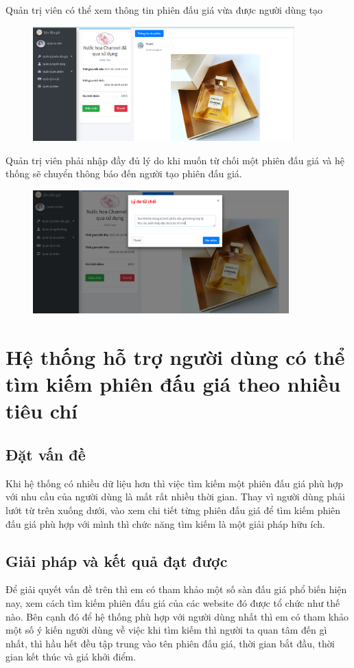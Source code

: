 \documentclass[../DoAn.tex]{subfiles}
\begin{document}
Quản trị viên có thể xem thông tin phiên đấu giá vừa được người dùng tạo
\begin{figure}[H]
    \centering
    \includegraphics[width=0.75\linewidth,height=4.41cm]{Hinhve/adminconfirm.png}
\end{figure}
Quản trị viên phải nhập đầy đủ lý do khi muốn từ chối một phiên đấu giá và hệ thống sẽ chuyển thông báo đến người tạo phiên đấu giá.
\begin{figure}[H]
    \centering
    \includegraphics[width=0.75\linewidth,height=4.74cm]{Hinhve/adminreject.png}
\end{figure}
\section{Hệ thống hỗ trợ người dùng có thể tìm kiếm phiên đấu giá theo nhiều tiêu chí}
\subsection{Đặt vấn đề}
Khi hệ thống có nhiều dữ liệu hơn thì việc tìm kiếm một phiên đấu giá phù hợp với nhu cầu của người dùng là mất rất nhiều thời gian. Thay vì người dùng phải lướt từ trên xuống dưới, vào xem chi tiết từng phiên đấu giá để tìm kiếm phiên đấu giá phù hợp với mình thì chức năng tìm kiếm là một giải pháp hữu ích.
\subsection{Giải pháp và kết quả đạt được}
Để giải quyết vấn đề trên thì em có tham khảo một số sàn đấu giá phổ biến hiện nay, xem cách tìm kiếm phiên đấu giá của các website đó được tổ chức như thế nào. Bên cạnh đó để hệ thống phù hợp với người dùng nhất thì em có tham khảo một số ý kiến người dùng về việc khi tìm kiếm thì người ta quan tâm đến gì nhất, thì hầu hết đều tập trung vào tên phiên đấu giá, thời gian bắt đầu, thời gian kết thúc và giá khởi điểm. 
\end{document}
